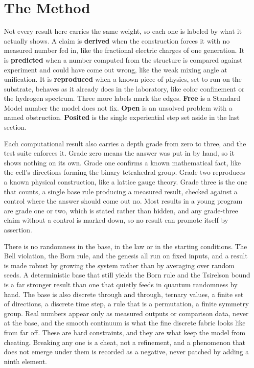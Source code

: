 \section{The Method}

Not every result here carries the same weight, so each one is labeled by what it actually shows. A claim is \textbf{derived} when the construction forces it with no measured number fed in, like the fractional electric charges of one generation. It is \textbf{predicted} when a number computed from the structure is compared against experiment and could have come out wrong, like the weak mixing angle at unification. It is \textbf{reproduced} when a known piece of physics, set to run on the substrate, behaves as it already does in the laboratory, like color confinement or the hydrogen spectrum. Three more labels mark the edges. \textbf{Free} is a Standard Model number the model does not fix. \textbf{Open} is an unsolved problem with a named obstruction. \textbf{Posited} is the single experiential step set aside in the last section.

Each computational result also carries a depth grade from zero to three, and the test suite enforces it. Grade zero means the answer was put in by hand, so it shows nothing on its own. Grade one confirms a known mathematical fact, like the cell's directions forming the binary tetrahedral group. Grade two reproduces a known physical construction, like a lattice gauge theory. Grade three is the one that counts, a single base rule producing a measured result, checked against a control where the answer should come out no. Most results in a young program are grade one or two, which is stated rather than hidden, and any grade-three claim without a control is marked down, so no result can promote itself by assertion.

There is no randomness in the base, in the law or in the starting conditions. The Bell violation, the Born rule, and the genesis all run on fixed inputs, and a result is made robust by growing the system rather than by averaging over random seeds. A deterministic base that still yields the Born rule and the Tsirelson bound is a far stronger result than one that quietly feeds in quantum randomness by hand. The base is also discrete through and through, ternary values, a finite set of directions, a discrete time step, a rule that is a permutation, a finite symmetry group. Real numbers appear only as measured outputs or comparison data, never at the base, and the smooth continuum is what the fine discrete fabric looks like from far off. These are hard constraints, and they are what keep the model from cheating. Breaking any one is a cheat, not a refinement, and a phenomenon that does not emerge under them is recorded as a negative, never patched by adding a ninth element.

